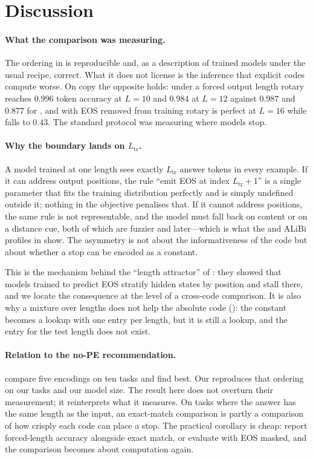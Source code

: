\section{Discussion}
\label{sec:discussion}

\paragraph{What the comparison was measuring.} The ordering in  is
reproducible and, as a description of trained models under the usual recipe, correct.
What it does not license is the inference that explicit codes compute worse. On copy
the opposite holds: under a forced output length rotary reaches $0.996$ token
accuracy at $L{=}10$ and $0.984$ at $L{=}12$ against $0.987$ and $0.877$ for \nope{},
and with EOS removed from training rotary is perfect at $L{=}16$ while \nope{} falls
to $0.43$. The standard protocol was measuring where models stop.

\paragraph{Why the boundary lands on $L_{\mathrm{tr}}$.} A model trained at one
length sees exactly $L_{\mathrm{tr}}$ answer tokens in every example. If it can
address output positions, the rule ``emit EOS at index $L_{\mathrm{tr}}{+}1$'' is a
single parameter that fits the training distribution perfectly and is simply
undefined outside it; nothing in the objective penalises that. If it cannot address
positions, the same rule is not representable, and the model must fall back on
content or on a distance cue, both of which are fuzzier and later---which is what
the \nope{} and ALiBi profiles in  show. The asymmetry is not
about the informativeness of the code but about whether a stop can be encoded as a
constant.

This is the mechanism behind the ``length attractor'' of \citet{newman2020eos}:
they showed that models trained to predict EOS stratify hidden states by position
and stall there, and we locate the consequence at the level of a cross-code
comparison. It is also why a mixture over lengths does not help the absolute code
(): the constant becomes a lookup with one entry per length, but
it is still a lookup, and the entry for the test length does not exist.

\paragraph{Relation to the no-PE recommendation.} \citet{kazemnejad2023impact}
compare five encodings on ten tasks and find \nope{} best. Our 
reproduces that ordering on our tasks and our model size. The result here does not
overturn their measurement; it reinterprets what it measures. On tasks where the
answer has the same length as the input, an exact-match comparison is partly a
comparison of how crisply each code can place a stop. The practical corollary is
cheap: report forced-length accuracy alongside exact match, or evaluate with EOS
masked, and the comparison becomes about computation again.

